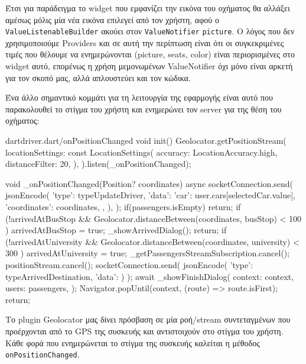 \documentclass[../thesis.tex]{subfiles}
\begin{document}
Έτσι για παράδειγμα το widget που εμφανίζει την εικόνα του οχήματος θα αλλάξει αμέσως μόλις μία νέα εικόνα επιλεγεί από τον χρήστη, αφού ο \texttt{Value\-Listenable\-Builder} ακούει στον \texttt{Value\-Notifier} \texttt{picture}.
Ο λόγος που δεν χρησιμοποιούμε Providers και σε αυτή την περίπτωση είναι ότι οι συγκεκριμένες τιμές που θέλουμε να ενημερώνονται (picture, seats, color) είναι περιορισμένες στο widget αυτό, επομένως η χρήση μεμονωμένων ValueNotifier όχι μόνο είναι αρκετή για τον σκοπό μας, αλλά απλουστεύει και τον κώδικα.

\bigskip

Ένα άλλο σημαντικό κομμάτι για τη λειτουργία της εφαρμογής είναι αυτό που παρακολουθεί το στίγμα του χρήστη και ενημερώνει τον server για της θέση του οχήματος:

\begin{codeblock}{dart}{driver.dart/onPositionChanged}
  void init(){
    Geolocator.getPositionStream(
        locationSettings: const LocationSettings(
          accuracy: LocationAccuracy.high,
          distanceFilter: 20,
        ),
      ).listen(_onPositionChanged);
  }

  void _onPositionChanged(Position? coordinates) async {
    socketConnection.send(
      jsonEncode({
        'type': typeUpdateDriver,
        'data': {
          'car': user.cars[selectedCar.value],
          'coordinates': coordinates,
        },
      }),
    );
    if(passengers.isEmpty) return;
    if (!arrivedAtBusStop &&
        Geolocator.distanceBetween(coordinates, busStop) < 100
        ) {
      arrivedAtBusStop = true;
      _showArrivedDialog();
      return;
    }
    if (!arrivedAtUniversity &&
        Geolocator.distanceBetween(coordinates, university) < 300
        ) {
      arrivedAtUniversity = true;
      _getPassengersStreamSubscription.cancel();
      positionStream.cancel();
      socketConnection.send(
        jsonEncode({
          'type': typeArrivedDestination,
          'data': {}
        })
      );
      await _showFinishDialog(
        context: context,
        users: passengers,
      );
      Navigator.popUntil(context, (route) => route.isFirst);
      return;
    }
  }
\end{codeblock}

Το plugin Geolocator μας δίνει πρόσβαση σε μία ροή/stream συντεταγμένων που προέρχονται από το GPS της συσκευής και αντιστοιχούν στο στίγμα του χρήστη.
Κάθε φορά που ενημερώνεται το στίγμα της συσκευής καλείται η μέθοδος \texttt{on\-Position\-Changed}.
\end{document}
